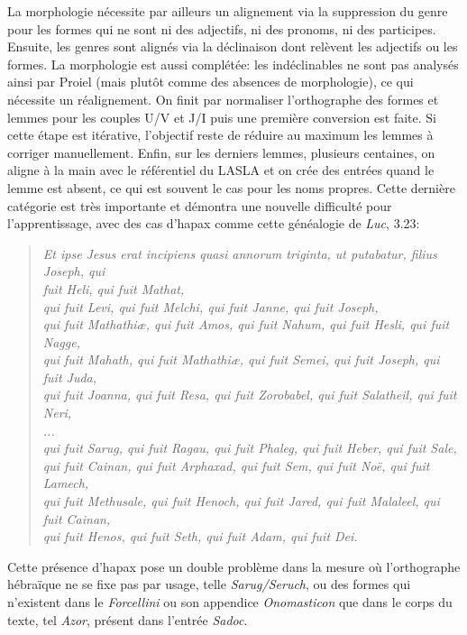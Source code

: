 La morphologie nécessite par ailleurs un alignement via la suppression du genre pour les formes qui ne sont ni des adjectifs, ni des pronoms, ni des participes. Ensuite, les genres sont alignés via la déclinaison dont relèvent les adjectifs ou les formes. La morphologie est aussi complétée: les indéclinables ne sont pas analysés ainsi par Proiel (mais plutôt comme des absences de morphologie), ce qui nécessite un réalignement. On finit par normaliser l'orthographe des formes et lemmes pour les couples U/V et J/I puis une première conversion est faite. Si cette étape est itérative, l'objectif reste de réduire au maximum les lemmes à corriger manuellement. Enfin, sur les derniers lemmes, plusieurs centaines, on aligne à la main avec le référentiel du LASLA et on crée des entrées quand le lemme est absent, ce qui est souvent le cas pour les noms propres. Cette dernière catégorie est très importante et démontra une nouvelle difficulté pour l'apprentissage, avec des cas d'hapax comme cette généalogie de \textit{Luc}, 3.23:

\blockquote{\textit{Et ipse Jesus erat incipiens quasi annorum triginta, ut putabatur, filius Joseph, qui  \\fuit Heli, qui fuit Mathat, \\
qui fuit Levi, qui fuit Melchi, qui fuit Janne, qui fuit Joseph, \\
qui fuit Mathathiæ, qui fuit Amos, qui fuit Nahum, qui fuit Hesli, qui fuit Nagge, \\
qui fuit Mahath, qui fuit Mathathiæ, qui fuit Semei, qui fuit Joseph, qui fuit Juda, \\
qui fuit Joanna, qui fuit Resa, qui fuit Zorobabel, qui fuit Salatheil, qui fuit Neri, \\
\textit{...} \\
qui fuit Sarug, qui fuit Ragau, qui fuit Phaleg, qui fuit Heber, qui fuit Sale, \\
qui fuit Cainan, qui fuit Arphaxad, qui fuit Sem, qui fuit Noë, qui fuit Lamech, \\
qui fuit Methusale, qui fuit Henoch, qui fuit Jared, qui fuit Malaleel, qui fuit Cainan, \\
qui fuit Henos, qui fuit Seth, qui fuit Adam, qui fuit Dei.}}

Cette présence d'hapax pose un double problème dans la mesure où l'orthographe hébraïque ne se fixe pas par usage, telle \textit{Sarug/Seruch}, ou des formes qui n'existent dans le \textit{Forcellini} ou son appendice \textit{Onomasticon} que dans le corps du texte, tel \textit{Azor}, présent dans l'entrée \textit{Sadoc}.

